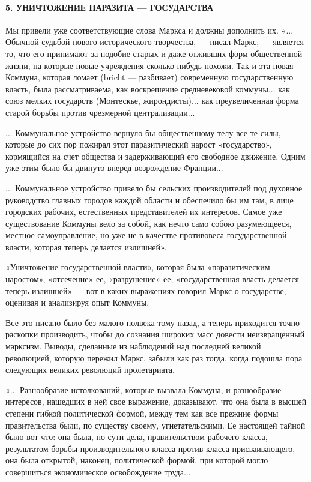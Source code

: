 \documentclass[12pt]{article}
\newcommand{\parnum}{(\arabic{parcount})}
\newcounter{parcount}
\newenvironment{parnumbers}{%
  \par%
  \everypar{\noindent \stepcounter{parcount}\marginpar[]{\parnum}}%
}{}
\begin{document}
\paragraph{5. УНИЧТОЖЕНИЕ ПАРАЗИТА — ГОСУДАРСТВА}
\begin{parnumbers}
Мы привели уже соответствующие слова Маркса и должны дополнить их. «... Обычной судьбой нового исторического творчества, — писал Маркс, — является то, что его принимают за подобие старых и даже отживших форм общественной жизни, на которые новые учреждения сколько-нибудь похожи. Так и эта новая Коммуна, которая ломает (bricht — разбивает) современную государственную власть, была рассматриваема, как воскрешение средневековой коммуны... как союз мелких государств (Монтескье, жирондисты)... как преувеличенная форма старой борьбы против чрезмерной централизации...

... Коммунальное устройство вернуло бы общественному телу все те силы, которые до сих пор пожирал этот паразитический нарост «государство», кормящийся на счет общества и задерживающий его свободное движение. Одним уже этим было бы двинуто вперед возрождение Франции...

... Коммунальное устройство привело бы сельских производителей под духовное руководство главных городов каждой области и обеспечило бы им там, в лице городских рабочих, естественных представителей их интересов. Самое уже существование Коммуны вело за собой, как нечто само собою разумеющееся, местное самоуправление, но уже не в качестве противовеса государственной власти, которая теперь делается излишней».

«Уничтожение государственной власти», которая была «паразитическим наростом», «отсечение» ее, «разрушение» ее; «государственная власть делается теперь излишней» — вот в каких выражениях говорил Маркс о государстве, оценивая и анализируя опыт Коммуны.

Все это писано было без малого полвека тому назад, а теперь приходится точно раскопки производить, чтобы до сознания широких масс довести неизвращенный марксизм. Выводы, сделанные из наблюдений над последней великой революцией, которую пережил Маркс, забыли как раз тогда, когда подошла пора следующих великих революций пролетариата.

«... Разнообразие истолкований, которые вызвала Коммуна, и разнообразие интересов, нашедших в ней свое выражение, доказывают, что она была в высшей степени гибкой политической формой, между тем как все прежние формы правительства были, по существу своему, угнетательскими. Ее настоящей тайной было вот что: она была, по сути дела, правительством рабочего класса, результатом борьбы производительного класса против класса присваивающего, она была открытой, наконец, политической формой, при которой могло совершиться экономическое освобождение труда...


\end{parnumbers}
\end{document}
